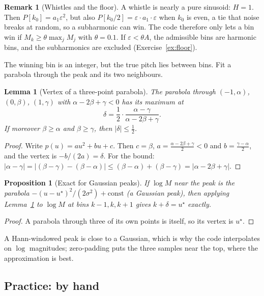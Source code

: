 \documentclass[11pt]{article}
\newtheorem{proposition}[theorem]{Proposition}
\newtheorem{lemma}[theorem]{Lemma}
\theoremstyle{definition}
\newtheorem{remark}[theorem]{Remark}
\newcommand{\abs}[1]{\lvert #1\rvert}
\begin{document}
\begin{remark}[Whistles and the floor]
A whistle is nearly a pure sinusoid: $H=1$. Then $P[k_0]=a_1\varepsilon^2$, but also
$P[k_0/2]=\varepsilon\cdot a_1\cdot\varepsilon$ when $k_0$ is even, a tie that noise
breaks at random, so a subharmonic can win. The code therefore only lets a bin win if
$M_k\ge\theta\max_jM_j$ with $\theta=0.1$. If $\varepsilon<\theta A$, the admissible
bins are harmonic bins, and the subharmonics are excluded
(Exercise~\ref{ex:floor}).
\end{remark}

The winning bin is an integer, but the true pitch lies between bins. Fit a parabola
through the peak and its two neighbours.

\begin{lemma}[Vertex of a three-point parabola]\label{lem:vertex}
The parabola through $(-1,\alpha)$, $(0,\beta)$, $(1,\gamma)$ with
$\alpha-2\beta+\gamma<0$ has its maximum at
\[
\delta=\frac12\cdot\frac{\alpha-\gamma}{\alpha-2\beta+\gamma}.
\]
If moreover $\beta\ge\alpha$ and $\beta\ge\gamma$, then $\abs\delta\le\frac12$.
\end{lemma}
\begin{proof}
Write $p(u)=au^2+bu+c$. Then $c=\beta$, $a=\frac{\alpha-2\beta+\gamma}2<0$ and
$b=\frac{\gamma-\alpha}2$, and the vertex is $-b/(2a)=\delta$. For the bound:
$\abs{\alpha-\gamma}=\abs{(\beta-\gamma)-(\beta-\alpha)}\le(\beta-\alpha)+(\beta-\gamma)
=\abs{\alpha-2\beta+\gamma}$.
\end{proof}

\begin{proposition}[Exact for Gaussian peaks]
If $\log M$ near the peak is the parabola $-(u-u^\star)^2/(2\sigma^2)+\text{const}$ (a
Gaussian peak), then applying Lemma~\ref{lem:vertex} to $\log M$ at bins $k-1,k,k+1$
gives $k+\delta=u^\star$ exactly.
\end{proposition}
\begin{proof}
A parabola through three of its own points is itself, so its vertex is $u^\star$.
\end{proof}

A Hann-windowed peak is close to a Gaussian, which is why the code interpolates on
$\log$ magnitudes; zero-padding puts the three samples near the top, where the
approximation is best.

\subsection{Practice: by hand}
\end{document}
